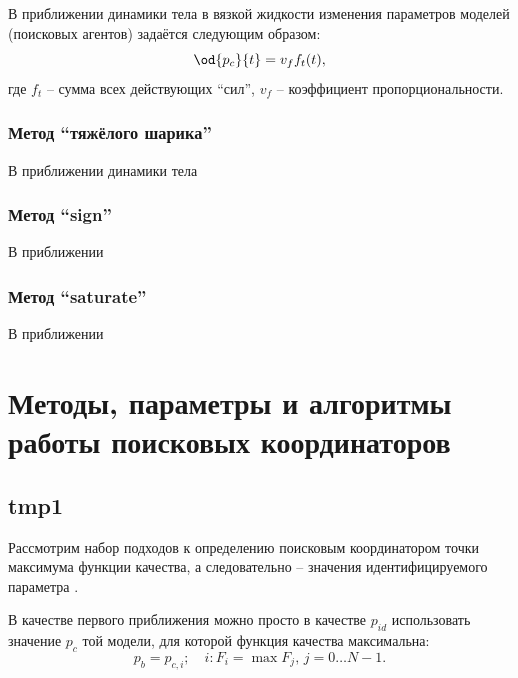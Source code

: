 В приближении динамики тела в вязкой жидкости
изменения параметров моделей (поисковых агентов) задаётся следующим образом:
%
\begin{equation}
  \od{p_c}{t} = v_f f_t(t),
  \label{atu:eq:dp_dt}
\end{equation}
%
\noindent
где $f_t$ -- сумма всех действующих ``сил'', $v_f$ -- коэффициент
пропорциональности.

\subsubsection{Метод ``тяжёлого шарика''}  %

В приближении динамики тела 



\subsubsection{Метод ``sign''}  %

В приближении


\subsubsection{Метод ``saturate''}  %

В приближении










\section{Методы, параметры и алгоритмы работы поисковых координаторов}  %

\subsection{tmp1} %


Рассмотрим набор подходов к определению поисковым координатором
точки максимума функции качества, а следовательно -- значения идентифицируемого параметра \cite{atu_st99,atu_jacs2015}.

В качестве первого приближения можно просто в качестве $p_{id}$
использовать значение $p_c$ той модели, для которой функция качества максимальна:
%
\begin{equation}
  p_{b}
  =
  p_{c,i};
  \quad
  i : F_i = \max{F_j}, \, j=0 \ldots N-1 .
  \label{atu:eq:p_b}
\end{equation}

